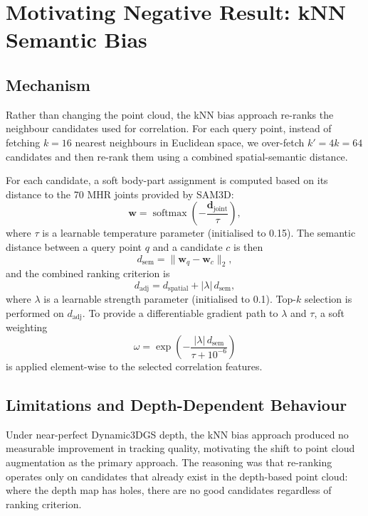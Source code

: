 \documentclass[12pt, a4paper, oneside]{report}
\begin{document}
\section{Motivating Negative Result: kNN Semantic Bias}
\label{sec:knn_bias}

\subsection{Mechanism}
Rather than changing the point cloud, the kNN bias approach re-ranks the neighbour candidates used for correlation. For each query point, instead of fetching $k=16$ nearest neighbours in Euclidean space, we over-fetch $k' = 4k = 64$ candidates and then re-rank them using a combined spatial-semantic distance.

For each candidate, a soft body-part assignment is computed based on its distance to the 70 MHR joints provided by SAM3D:
\begin{equation}
    \mathbf{w} = \operatorname{softmax}\left( -\frac{\mathbf{d}_{\text{joint}}}{\tau} \right),
\end{equation}
where $\tau$ is a learnable temperature parameter (initialised to 0.15). The semantic distance between a query point $q$ and a candidate $c$ is then
\begin{equation}
    d_{\text{sem}} = \lVert \mathbf{w}_{q} - \mathbf{w}_{c} \rVert_2,
\end{equation}
and the combined ranking criterion is
\begin{equation}
    d_{\text{adj}} = d_{\text{spatial}} + |\lambda|\, d_{\text{sem}},
\end{equation}
where $\lambda$ is a learnable strength parameter (initialised to 0.1). Top-$k$ selection is performed on $d_{\text{adj}}$. To provide a differentiable gradient path to $\lambda$ and $\tau$, a soft weighting
\begin{equation}
    \omega = \exp\!\left(-\frac{|\lambda|\, d_{\text{sem}}}{\tau + 10^{-6}}\right)
\end{equation}
is applied element-wise to the selected correlation features.

\subsection{Limitations and Depth-Dependent Behaviour}
Under near-perfect Dynamic3DGS depth, the kNN bias approach produced no measurable improvement in tracking quality, motivating the shift to point cloud augmentation as the primary approach. The reasoning was that re-ranking operates only on candidates that already exist in the depth-based point cloud: where the depth map has holes, there are no good candidates regardless of ranking criterion.
\end{document}
